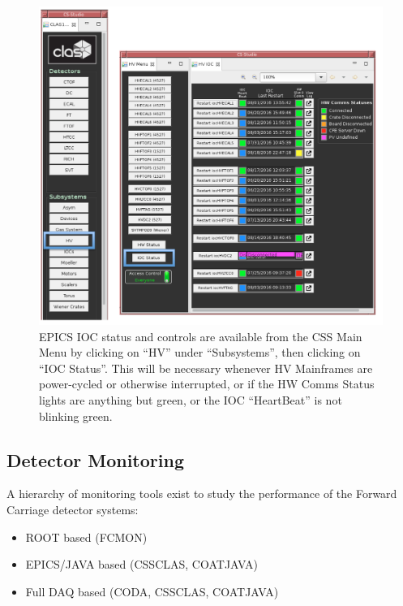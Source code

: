 \documentclass[letterpaper,10pt]{article}
\begin{document}
\begin{figure}[htbp]
  \centering
  \includegraphics[width= 6in, keepaspectratio = true]{HV_IOC_2}
  \vspace{2mm}
  \caption{EPICS IOC status and controls are available from the CSS Main Menu by clicking on ``HV'' under ``Subsystems'',
    then clicking on ``IOC Status''.  This will be necessary whenever HV Mainframes are power-cycled or otherwise
  interrupted, or if the HW Comms Status lights are anything but green, or the IOC ``HeartBeat'' is not blinking green.}
  \label{ecal-screen4}
\end{figure}

\vfil
\eject

\subsection{Detector Monitoring}
\label{monitoring}

A hierarchy of monitoring tools exist to study the performance of the Forward Carriage detector systems:

\begin{itemize}
\item ROOT based (FCMON)
\item EPICS/JAVA based (CSSCLAS, COATJAVA)
\item Full DAQ based (CODA, CSSCLAS, COATJAVA)
\end{itemize}
\end{document}
